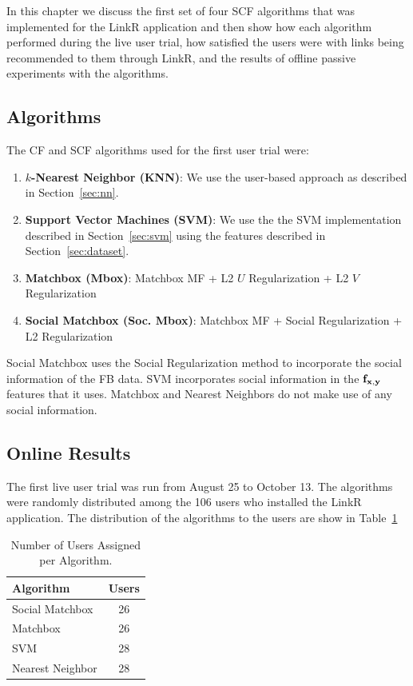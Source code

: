 In this chapter we discuss the first set of four SCF algorithms that
was implemented for the LinkR application and then show how each
algorithm performed during the live user trial, how satisfied the
users were with links being recommended to them through LinkR, and the
results of offline passive experiments with the algorithms.

\subsection{Algorithms}

The CF and SCF algorithms used for the first user trial were:

\begin{enumerate}
\item{ {\bf $k$-Nearest Neighbor (KNN)}: We use the user-based approach as described in Section~\ref{sec:nn}.}
\item{{\bf Support Vector Machines (SVM)}: We use the the SVM implementation described in Section~\ref{sec:svm} using the features described in Section~\ref{sec:dataset}.}
\item{{\bf Matchbox (Mbox)}: Matchbox MF  + L2 $U$ Regularization + L2 $V$ Regularization}
\item{{\bf Social Matchbox (Soc. Mbox)}: Matchbox MF + Social Regularization + L2 Regularization}
\end{enumerate}

Social Matchbox uses the Social Regularization method to incorporate the social information of the FB data. SVM incorporates social information in the $\mathbf{f}_{\mathbf{x},\mathbf{y}}$ features that it uses. Matchbox and Nearest Neighbors do not make use of any social information.

\subsection{Online Results}

The first live user trial was run from August 25 to October 13. The algorithms were randomly distributed among the 106 users who installed the LinkR application. The distribution of the algorithms to the users are show in Table~\ref{tab:Assigned1}

\begin{table}[t!]
\centering
\begin{tabular}{| l | c |}
\hline
{\bf Algorithm} & {\bf Users} \\
\hline
Social Matchbox & 26\\
Matchbox  & 26 \\
SVM & 28 \\
Nearest Neighbor & 28 \\
\hline
\end{tabular}
\caption{Number of Users Assigned per Algorithm.}
\label{tab:Assigned1}
\end{table}

